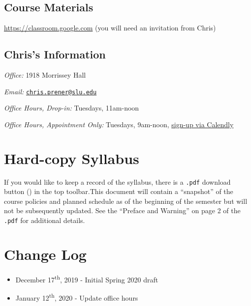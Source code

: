 \documentclass[]{book}
\providecommand{\tightlist}{%
  \setlength{\itemsep}{0pt}\setlength{\parskip}{0pt}}
\begin{document}
\hypertarget{course-materials}{%
\subsection*{Course Materials}\label{course-materials}}

\url{https://classroom.google.com} (you will need an invitation from Chris)

\hypertarget{chriss-information}{%
\subsection*{Chris's Information}\label{chriss-information}}

\emph{Office:} 1918 Morrissey Hall

\emph{Email:} \href{mailto:chris.prener@slu.edu}{\nolinkurl{chris.prener@slu.edu}}

\emph{Office Hours, Drop-in:} Tuesdays, 11am-noon

\emph{Office Hours, Appointment Only:} Tuesdays, 9am-noon, \href{https://calendly.com/chris-prener}{sign-up via Calendly}

\hypertarget{hard-copy-syllabus}{%
\section*{Hard-copy Syllabus}\label{hard-copy-syllabus}}

If you would like to keep a record of the syllabus, there is a \texttt{.pdf} download button () in the top toolbar.This document will contain a ``snapshot'' of the course policies and planned schedule as of the beginning of the semester but will not be subsequently updated. See the ``Preface and Warning'' on page 2 of the \texttt{.pdf} for additional details.

\hypertarget{change-log}{%
\section*{Change Log}\label{change-log}}

\begin{itemize}
\tightlist
\item
  December 17\textsuperscript{th}, 2019 - Initial Spring 2020 draft
\item
  January 12\textsuperscript{th}, 2020 - Update office hours
\end{itemize}
\end{document}
